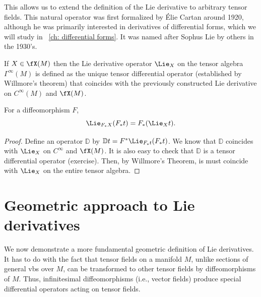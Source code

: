 This allows us to extend the definition of the Lie derivative to arbitrary tensor fields. This natural operator was first formalized by \'Elie Cartan around 1920, although he was primarily interested in derivatives of differential forms, which we will study in \Chap~\ref{ch: differential forms}. It was named after Sophus Lie by others in the 1930's.

\begin{defn}
    If $X\in\fX(M)$ then the Lie derivative operator $\Lie_X$ on the tensor algebra $\Gamma^\infty(M)$ is defined as the unique tensor differential operator (established by Willmore's theorem) that coincides with the previously constructed Lie derivative on $C^\infty(M)$ and $\fX(M)$.
\end{defn}

\begin{prop}\label{pullbacks of Lie derivatives}
For a diffeomorphism $F$, 
\[\Lie_{F_\ast X}(F_\ast t)=F_\ast (\Lie_X t).\]
\end{prop}
\begin{proof}
    Define an operator $\mathbb{D}$ by $\mathbb{D}t=F^\ast \Lie_{F_\ast t}(F_\ast t)$. We know that $\mathbb{D}$ coincides with $\Lie_X$ on $C^\infty$ and $\fX(M)$. It is also easy to check that $\mathbb{D}$ is a tensor differential operator (exercise). Then, by Willmore's Theorem, is must coincide with $\Lie_X$ on the entire tensor algebra.
\end{proof}





\section{Geometric approach to Lie derivatives}

We now demonstrate a more fundamental geometric definition of Lie derivatives. It has to do with the fact that tensor fields on a manifold $M$, unlike sections of general \glspl{vb} over $M$, can be transformed to other tensor fields by diffeomorphisms of $M$. Thus, infinitesimal diffeomorphisms (i.e., vector fields) produce special differential operators acting on tensor fields.


